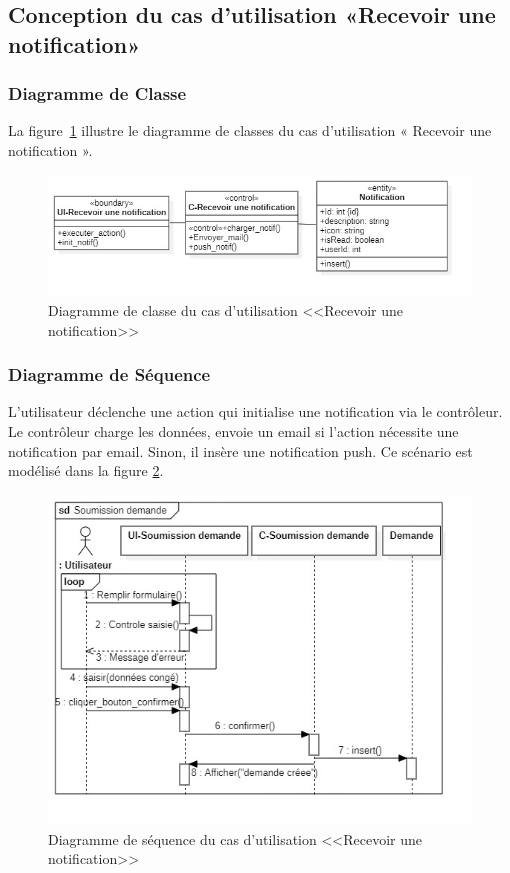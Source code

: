 \subsection{Conception du cas d’utilisation «Recevoir une notification»}
\subsubsection{Diagramme de Classe}
La figure~\ref{fig:class_notif_rec} illustre le diagramme de classes du cas d'utilisation « Recevoir une notification ».
\begin{figure}[h]
     \centering
     \includegraphics[width=14cm]{images/C_recnot.jpg}
     \caption{Diagramme de classe du cas d'utilisation <<Recevoir une notification>>}
     \label{fig:class_notif_rec}
\end{figure}
\subsubsection{Diagramme de Séquence}
L'utilisateur déclenche une action qui initialise une notification via le contrôleur. Le contrôleur charge les données, envoie un email si l'action nécessite une notification par email. Sinon, il insère une notification push.
Ce scénario est modélisé dans la figure \ref{fig:S_notif_rec}.
\begin{figure}[ht]
    \centering
    \includegraphics[width=13cm, height=0.9\textheight, keepaspectratio]{images/S_Soumission demande.jpg}
    \caption{Diagramme de séquence du cas d'utilisation <<Recevoir une notification>>}
    \label{fig:S_notif_rec}
\end{figure}
\newpage
